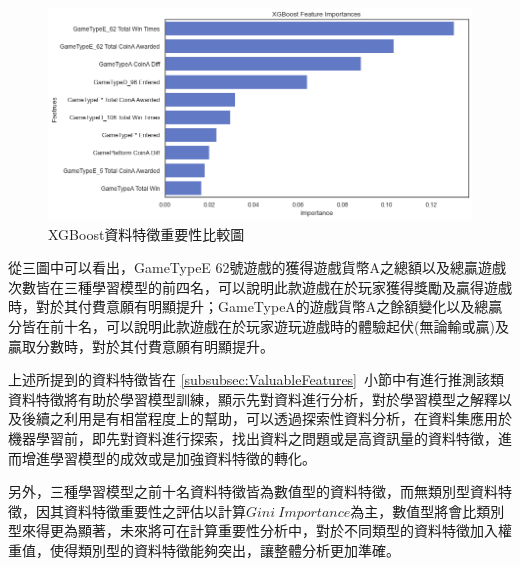 \begin{figure}[!htb]
    \begin{center}
      \includegraphics[width=1\textwidth]{figures/evaluation/Image_XGBFeatureImportances.png}
      \caption[XGBoost資料特徵重要性比較圖]{XGBoost資料特徵重要性比較圖}
      \label{fig:eva_XGBFeatureImportances}
    \end{center}
\end{figure}
\newpage

從三圖中可以看出，GameTypeE 62號遊戲的獲得遊戲貨幣A之總額以及總贏遊戲次數皆在三種學習模型的前四名，可以說明此款遊戲在於玩家獲得獎勵及贏得遊戲時，對於其付費意願有明顯提升；GameTypeA的遊戲貨幣A之餘額變化以及總贏分皆在前十名，可以說明此款遊戲在於玩家遊玩遊戲時的體驗起伏(無論輸或贏)及贏取分數時，對於其付費意願有明顯提升。

上述所提到的資料特徵皆在 \ref{subsubsec:ValuableFeatures}~小節中有進行推測該類資料特徵將有助於學習模型訓練，顯示先對資料進行分析，對於學習模型之解釋以及後續之利用是有相當程度上的幫助，可以透過探索性資料分析，在資料集應用於機器學習前，即先對資料進行探索，找出資料之問題或是高資訊量的資料特徵，進而增進學習模型的成效或是加強資料特徵的轉化。

另外，三種學習模型之前十名資料特徵皆為數值型的資料特徵，而無類別型資料特徵，因其資料特徵重要性之評估以計算$Gini\ Importance$為主，數值型將會比類別型來得更為顯著，未來將可在計算重要性分析中，對於不同類型的資料特徵加入權重值，使得類別型的資料特徵能夠突出，讓整體分析更加準確。
\newpage